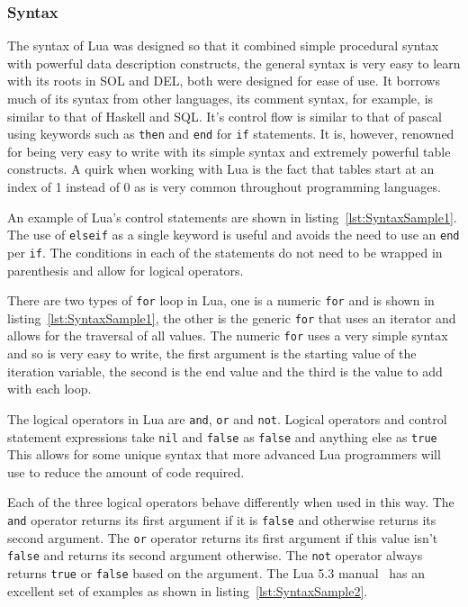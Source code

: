\documentclass[11pt,a4paper,titlepage]{article}
\begin{document}
		\subsubsection{Syntax}
			The syntax of Lua was designed so that it combined simple procedural syntax with powerful data description constructs, the general syntax is very easy to learn with its roots in SOL and DEL, both were designed for ease of use. It borrows much of its syntax from other languages, its comment syntax, for example, is similar to that of Haskell and SQL. It's control flow is similar to that of pascal using keywords such as \texttt{then} and \texttt{end} for \texttt{if} statements. It is, however, renowned for being very easy to write with its simple syntax and extremely powerful table constructs. A quirk when working with Lua is the fact that tables start at an index of 1 instead of 0 as is very common throughout programming languages.

			An example of Lua's control statements are shown in listing~\ref{lst:SyntaxSample1}. The use of \texttt{elseif} as a single keyword is useful and avoids the need to use an \texttt{end} per \texttt{if}. The conditions in each of the statements do not need to be wrapped in parenthesis and allow for logical operators. 

			

			There are two types of \texttt{for} loop in Lua, one is a numeric \texttt{for} and is shown in listing~\ref{lst:SyntaxSample1}, the other is the generic \texttt{for} that uses an iterator and allows for the traversal of all values. The numeric \texttt{for} uses a very simple syntax and so is very easy to write, the first argument is the starting value of the iteration variable, the second is the end value and the third is the value to add with each loop.

			The logical operators in Lua are \texttt{and}, \texttt{or} and \texttt{not}. Logical operators and control statement expressions take \texttt{nil} and \texttt{false} as \texttt{false} and anything else as \texttt{true}~\cite{LuaMan} This allows for some unique syntax that more advanced Lua programmers will use to reduce the amount of code required.

			Each of the three logical operators behave differently when used in this way. The \texttt{and} operator returns its first argument if it is \texttt{false} and otherwise returns its second argument. The \texttt{or} operator returns its first argument if this value isn't \texttt{false} and returns its second argument otherwise. The \texttt{not} operator always returns \texttt{true} or \texttt{false} based on the argument. The Lua 5.3 manual~\cite{LuaMan} has an excellent set of examples as shown in listing~\ref{lst:SyntaxSample2}.
			
\end{document}
